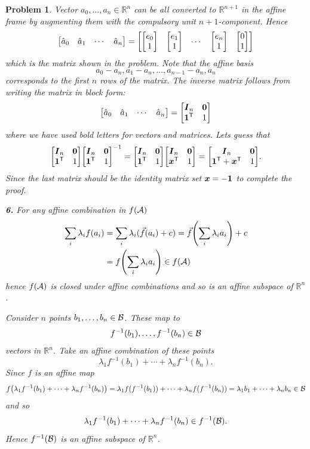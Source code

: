 \documentclass{article}
\newcommand{\subno}[1]{\par\noindent\textbf{#1}}
\newcommand{\T}{\mathsf{T}}
\newcommand{\R}{\mathbb{R}}
\theoremstyle{pprop}
\newtheorem{problem}{Problem}[section]
\begin{document}
\begin{problem}
Vector $a_0,\ldots,a_n \in \R^n$ can be all converted to $\R^{n+1}$ in the affine frame by augmenting them 
with the compulsory unit $n+1$-component. Hence 
\[
\mqty[\hat{a}_0 & \hat{a}_1 & \cdots & \hat{a}_n] 
=
\mqty[
  \mqty[e_0 \\ 1] & \mqty[e_1 \\ 1] & \cdots & \mqty[e_n \\ 1] & \mqty[0 \\ 1] 
]
\]
which is the matrix shown in the problem. Note that the affine basis 
$$a_0-a_n,a_1-a_n,\ldots,a_{n-1}-a_n,a_n$$ 
corresponds to the first $n$ rows of the matrix. The inverse matrix follows from writing the matrix
in block form:
\[
\mqty[\hat{a}_0 & \hat{a}_1 & \cdots & \hat{a}_n]  = \mqty[\vb*{I}_n & \vb{0} \\ \vb{1}^\T & 1]
\]
where we have used bold letters for vectors and matrices. Lets guess that 
\[
\mqty[\vb*{I}_n & \vb{0} \\ \vb{1}^\T & 1]\mqty[\vb*{I}_n & \vb{0} \\ \vb{1}^\T & 1]^{-1}
=
\mqty[\vb*{I}_n & \vb{0} \\ \vb{1}^\T & 1]\mqty[\vb*{I}_n & \vb{0} \\ \vb*{x}^\T & 1]
=
\mqty[\vb*{I}_n & \vb{0} \\ \vb{1}^\T+\vb*{x}^\T & 1].
\]
Since the last matrix should be the identity matrix set $\vb*{x}=-\vb{1}$ to complete the proof. 
\subno{6.} For any affine combination in $f({\cal A})$ 
\begin{align*}
\sum_i \lambda_i f(a_i) & = \sum_i \lambda_i (\vec{f}(a_i) + c) =\vec{f}\qty(\sum_i\lambda_i a_i) + c \\
& = f\qty(\sum_i \lambda_i a_i) \in f({\cal A})    
\end{align*}
hence $f({\cal A})$ is closed under affine combinations and so is an affine subspace of $\R^n$.

Consider $n$ points $b_1,\ldots,b_n \in \cal B$. These map to 
\[
f^{-1}(b_1),\ldots,f^{-1}(b_n) \in \cal B
\]
vectors in $\R^n$. Take an affine combination of these points 
\[
\lambda_1 f^{-1}(b_1)+\cdots+\lambda_n f^{-1}(b_n).
\]
Since $f$ is an affine map 
\[
f\qty(\lambda_1 f^{-1}(b_1)+\cdots+\lambda_n f^{-1}(b_n))=
\lambda_1f(f^{-1}(b_1))+\cdots+\lambda_n f(f^{-1}(b_n))=\lambda_1 b_1 + \cdots + \lambda_n b_n \in \cal B
\]
and so 
\[
\lambda_1 f^{-1}(b_1)+\cdots+\lambda_n f^{-1}(b_n) \in f^{-1}({\cal B}).
\]
Hence $f^{-1}({\cal B})$ is an affine subspace of $\R^n$.

\end{problem}
\end{document}
